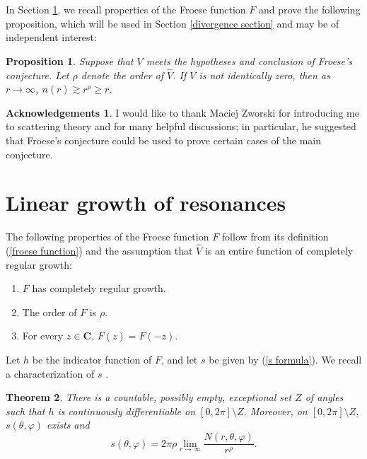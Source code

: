 \documentclass[reqno,12pt,letterpaper]{amsart}
\newcommand{\CC}{\mathbf{C}}
\newtheorem{theorem}{Theorem}[section]
\newtheorem{proposition}[theorem]{Proposition}
\theoremstyle{definition}
\newtheorem*{ack}{Acknowledgements}
\begin{document}
In Section \ref{linear growth}, we recall properties of the Froese function $F$ and prove the following proposition, which will be used in Section \ref{divergence section} and may be of independent interest:
\begin{proposition}
\label{linear lower bound}
Suppose that $V$ meets the hypotheses and conclusion of Froese's conjecture. Let $\rho$ denote the order of $\widehat V$. If $V$ is not identically zero, then as $r \to \infty$, $n(r) \gtrsim r^\rho \geq r$.
\end{proposition}

\begin{ack}
I would like to thank Maciej Zworski for introducing me to scattering theory and for many helpful discussions; in particular, he suggested that Froese's conjecture could be used to prove certain cases of the main conjecture.
\end{ack}

\section{Linear growth of resonances}
\label{linear growth}
The following properties of the Froese function $F$ follow from its definition (\ref{froese function}) and the assumption that $\widehat V$ is an entire function of completely regular growth:
\begin{enumerate}
\item $F$ has completely regular growth.
\item The order of $F$ is $\rho$.
\item For every $z \in \CC$, $F(z) = F(-z)$.
\end{enumerate}
Let $h$ be the indicator function of $F$, and let $s$ be given by (\ref{s formula}).
We recall a characterization of $s$ \cite[Theorem III.3]{levin1964distribution}.
\begin{theorem}
\label{zeroes of entire functions}
There is a countable, possibly empty, exceptional set $Z$ of angles such that $h$ is continuously differentiable on $[0, 2\pi] \setminus Z$.
Moreover, on $[0, 2\pi] \setminus Z$, $s(\theta, \varphi)$ exists and
$$s(\theta, \varphi) = 2\pi\rho \lim_{r\to\infty} \frac{N(r, \theta, \varphi)}{r^\rho}.$$
\end{theorem}
\end{document}

